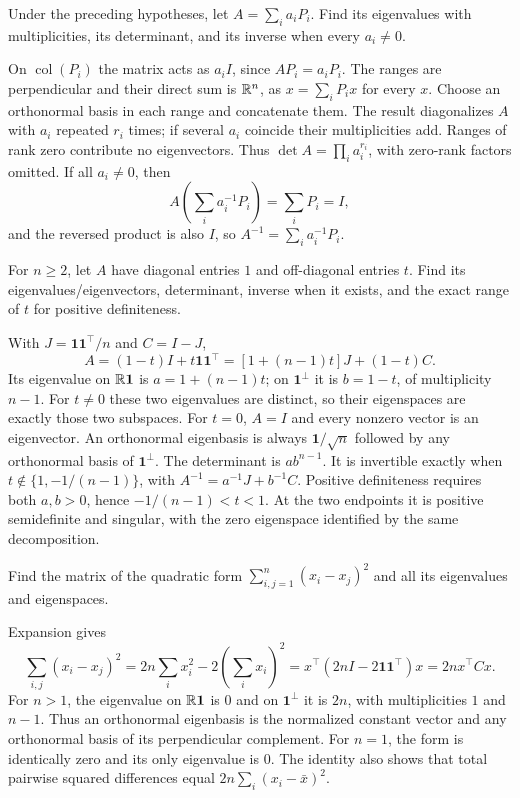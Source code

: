 \begin{problem}
Under the preceding hypotheses, let $A=\sum_i a_iP_i$.
Find its eigenvalues with multiplicities, its determinant, and its inverse
when every $a_i\ne0$.
\end{problem}
\begin{solution}
On $\operatorname{col}(P_i)$ the matrix acts as $a_iI$, since
$AP_i=a_iP_i$. The ranges are perpendicular and their direct sum is
$\mathbb R^n$, as $x=\sum_iP_ix$ for every $x$.
Choose an orthonormal basis in each range and concatenate them. The
result diagonalizes $A$ with $a_i$ repeated $r_i$ times; if several
$a_i$ coincide their multiplicities add. Ranges of rank zero contribute
no eigenvectors. Thus $\det A=\prod_i a_i^{r_i}$, with zero-rank factors
omitted. If all $a_i\ne0$, then
\[
A\left(\sum_i a_i^{-1}P_i\right)=\sum_iP_i=I,
\]
and the reversed product is also $I$, so
$A^{-1}=\sum_i a_i^{-1}P_i$.
\end{solution}

\begin{problem}[Equicorrelation]\label{ex:12:equicorrelation}
For $n\geqslant2$, let $A$ have diagonal entries $1$ and off-diagonal
entries $t$. Find its eigenvalues/eigenvectors, determinant, inverse
when it exists, and the exact range of $t$ for positive definiteness.
\end{problem}
\begin{solution}
With $J=\mathbf1\mathbf1^\top/n$ and $C=I-J$,
\[
A=(1-t)I+t\mathbf1\mathbf1^\top
=[1+(n-1)t]J+(1-t)C.
\]
Its eigenvalue on $\mathbb R\mathbf1$ is $a=1+(n-1)t$; on
$\mathbf1^\perp$ it is $b=1-t$, of multiplicity $n-1$.
For $t\ne0$ these two eigenvalues are distinct, so their eigenspaces
are exactly those two subspaces. For $t=0$, $A=I$ and every nonzero
vector is an eigenvector. An orthonormal eigenbasis is always
$\mathbf1/\sqrt n$ followed by any orthonormal basis of $\mathbf1^\perp$.
The determinant is $ab^{n-1}$. It is invertible exactly when
$t\notin\{1,-1/(n-1)\}$, with $A^{-1}=a^{-1}J+b^{-1}C$.
Positive definiteness requires both $a,b>0$, hence
$-1/(n-1)<t<1$. At the two endpoints it is positive semidefinite and
singular, with the zero eigenspace identified by the same decomposition.
\end{solution}

\begin{problem}
Find the matrix of the quadratic form $\sum_{i,j=1}^n(x_i-x_j)^2$ and
all its eigenvalues and eigenspaces.
\end{problem}
\begin{solution}
Expansion gives
\[
\sum_{i,j}(x_i-x_j)^2
=2n\sum_i x_i^2-2\left(\sum_i x_i\right)^2
=x^\top(2nI-2\mathbf1\mathbf1^\top)x=2n x^\top Cx.
\]
For $n>1$, the eigenvalue on $\mathbb R\mathbf1$ is $0$ and on
$\mathbf1^\perp$ it is $2n$, with multiplicities $1$ and $n-1$.
Thus an orthonormal eigenbasis is the normalized constant vector and
any orthonormal basis of its perpendicular complement.
For $n=1$, the form is identically zero and its only eigenvalue is $0$.
The identity also shows that total pairwise squared differences equal
$2n\sum_i(x_i-\bar x)^2$.
\end{solution}

